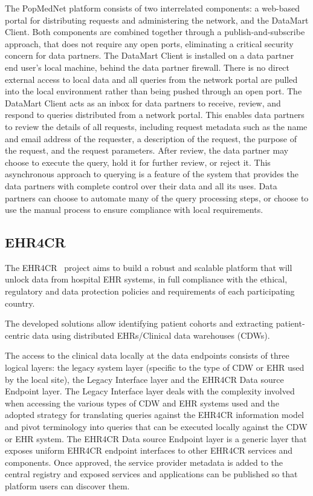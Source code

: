 The PopMedNet platform consists of two interrelated components: a web-based portal for distributing requests and administering the network, and the DataMart Client.
Both components are combined together through a publish-and-subscribe approach, that does not require any open ports, eliminating a critical security concern for data partners.
The DataMart Client is installed on a data partner end user’s local machine, behind the data partner firewall.
There is no direct external access to local data and all queries from the network portal are pulled into the local environment rather than being pushed through an open port.
The DataMart Client acts as an inbox for data partners to receive, review, and respond to queries distributed from a network portal.
This enables data partners to review the details of all requests, including request metadata such as the name and email address of the requester, a description of the request, the purpose of the request, and the request parameters.
After review, the data partner may choose to execute the query, hold it for further review, or reject it.
This asynchronous approach to querying is a feature of the system that provides the data partners with complete control over their data and all its uses.
Data partners can choose to automate many of the query processing steps, or choose to use the manual process to ensure compliance with local requirements.

\subsection*{EHR4CR}

The EHR4CR~\cite{ehr4cr} project aims to build a robust and scalable platform that will unlock data from hospital EHR systems, in full compliance with the ethical, regulatory and data protection policies and requirements of each participating country.

The developed solutions allow identifying patient cohorts and extracting patient-centric data using distributed EHRs/Clinical data warehouses (CDWs).

The access to the clinical data locally at the data endpoints consists of three logical layers: the legacy system layer (specific to the type of CDW or EHR used by the local site), the Legacy Interface layer and the EHR4CR Data source Endpoint layer.
The Legacy Interface layer deals with the complexity involved when accessing the various types of CDW and EHR systems used and the adopted strategy for translating queries against the EHR4CR information model and pivot terminology into queries that can be executed locally against the CDW or EHR system.
The EHR4CR Data source Endpoint layer is a generic layer that exposes uniform EHR4CR endpoint interfaces to other EHR4CR services and components.
Once approved, the service provider metadata is added to the central registry and exposed services and applications can be published so that platform users can discover them.

